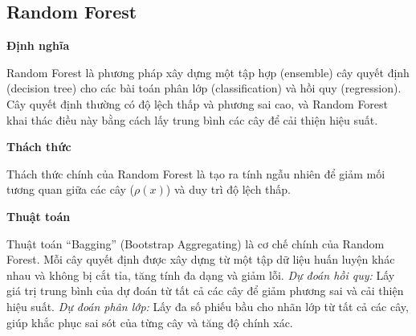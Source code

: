 \subsection{Random Forest}
\textbf{Định nghĩa}

Random Forest là phương pháp xây dựng một tập hợp (ensemble) cây quyết định (decision tree) cho các bài toán phân lớp (classification) và hồi quy (regression). Cây quyết định thường có độ lệch thấp và phương sai cao, và Random Forest khai thác điều này bằng cách lấy trung bình các cây để cải thiện hiệu suất.

\textbf{Thách thức}

Thách thức chính của Random Forest là tạo ra tính ngẫu nhiên để giảm mối tương quan giữa các cây ($\rho(x)$) và duy trì độ lệch thấp.

\textbf{Thuật toán}

Thuật toán “Bagging” (Bootstrap Aggregating) là cơ chế chính của Random Forest. Mỗi cây quyết định được xây dựng từ một tập dữ liệu huấn luyện khác nhau và không bị cắt tỉa, tăng tính đa dạng và giảm lỗi.
\textit{Dự đoán hồi quy:} Lấy giá trị trung bình của dự đoán từ tất cả các cây để giảm phương sai và cải thiện hiệu suất.
\textit{Dự đoán phân lớp:} Lấy đa số phiếu bầu cho nhãn lớp từ tất cả các cây, giúp khắc phục sai sót của từng cây và tăng độ chính xác.
